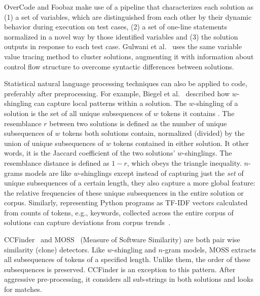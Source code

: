 OverCode and Foobaz make use of a pipeline that characterizes each solution as (1) a set of variables, which are distinguished from each other by their dynamic behavior during execution on test cases, (2) a set of one-line statements normalized in a novel way by those identified variables and (3) the solution outputs in response to each test case. Gulwani et al.~\cite{gulwani2016automated} uses the same variable value tracing method to cluster solutions, augmenting it with information about control flow structure to overcome syntactic differences between solutions.



Statistical natural language processing techniques can also be applied to code, preferably after preprocessing. For example, Biegel et al.~\cite{Biegel} described how $w$-shingling can capture local patterns within a solution. The $w$-shingling of a solution is the set of all unique subsequences of $w$ tokens it contains \cite{BRODER19971157}. The resemblance $r$ between two solutions is defined as the number of unique subsequences of $w$ tokens both solutions contain, normalized (divided) by the union of unique subsequences of $w$ tokens contained in either solution. It other words, it is the Jaccard coefficient of the two solutions' $w$-shinglings. The resemblance distance is defined as $1-r$, which obeys the triangle inequality. $n$-grams models are like $w$-shinglings except instead of capturing just the {\it set} of unique subsequences of a certain length, they also capture a more global feature: the relative frequencies of these unique subsequences in the entire solution or corpus. Similarly, representing Python programs as TF-IDF vectors calculated from counts of tokens, e.g., keywords, collected across the entire corpus of solutions can capture deviations from corpus trends~\cite{Gaudencio}.

CCFinder~\cite{CCFinder} and MOSS~\cite{schleimer2003winnowing} (Measure of Software Similarity) are both pair wise similarity (clone) detectors. Like $w$-shingling and $n$-gram models, MOSS extracts all subsequences of tokens of a specified length. Unlike them, the order of these subsequences is preserved. CCFinder \cite{CCFinder} is an exception to this pattern. After aggressive pre-processing, it considers all sub-strings in both solutions and looks for matches.

